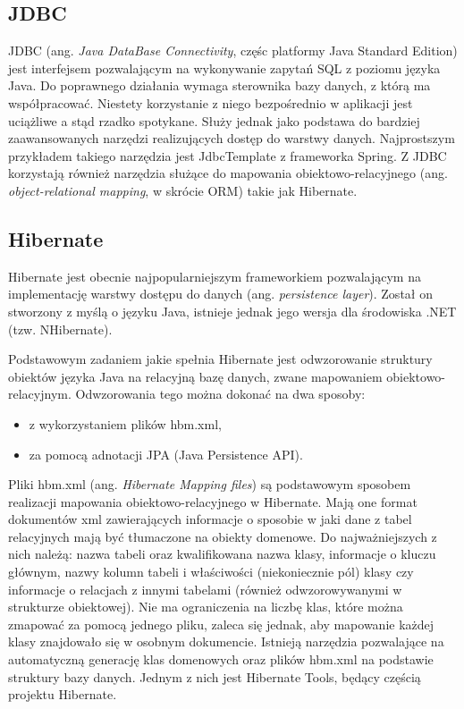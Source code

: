 
\subsection[JDBC][JDBC]{JDBC}
JDBC (ang. \textit{Java DataBase Connectivity}, częśc platformy Java Standard Edition) jest interfejsem pozwalającym na wykonywanie zapytań SQL z poziomu języka Java. Do poprawnego działania wymaga sterownika bazy danych, z którą ma współpracować. Niestety korzystanie z niego bezpośrednio w aplikacji jest uciążliwe a stąd rzadko spotykane. Służy jednak jako podstawa do bardziej zaawansowanych narzędzi realizujących dostęp do warstwy danych. Najprostszym przykładem takiego narzędzia jest JdbcTemplate z frameworka Spring. Z JDBC korzystają również narzędzia służące do mapowania obiektowo-relacyjnego (ang. \textit{object-relational mapping}, w skrócie ORM) takie jak Hibernate.

\subsection[Hibernate][Hibernate]{Hibernate}
\label{hibernate}
Hibernate jest obecnie najpopularniejszym frameworkiem pozwalającym na implementację warstwy dostępu do danych (ang. \textit{persistence layer}). Został on stworzony z myślą o języku Java, istnieje jednak jego wersja dla środowiska .NET (tzw. NHibernate).

Podstawowym zadaniem jakie spełnia Hibernate jest odwzorowanie struktury obiektów języka Java na relacyjną bazę danych, zwane mapowaniem obiektowo-relacyjnym. Odwzorowania tego można dokonać na dwa sposoby:
\begin{itemize}
	\item z wykorzystaniem plików hbm.xml,
	\item za pomocą adnotacji JPA (Java Persistence API).
\end{itemize}

Pliki hbm.xml (ang. \textit{Hibernate Mapping files}) są podstawowym sposobem realizacji mapowania obiektowo-relacyjnego w Hibernate. Mają one format dokumentów xml zawierających informacje o sposobie w jaki dane z tabel relacyjnych mają być tłumaczone na obiekty domenowe. Do najważniejszych z nich należą: nazwa tabeli oraz kwalifikowana nazwa klasy, informacje o kluczu głównym, nazwy kolumn tabeli i właściwości (niekoniecznie pól) klasy czy  informacje o relacjach z innymi tabelami (również odwzorowywanymi w strukturze obiektowej). Nie ma ograniczenia na liczbę klas, które można zmapować za pomocą jednego pliku, zaleca się jednak, aby mapowanie każdej klasy znajdowało się w osobnym dokumencie. Istnieją narzędzia pozwalające na automatyczną generację klas domenowych oraz plików hbm.xml na podstawie struktury bazy danych. Jednym z nich jest Hibernate Tools, będący częścią projektu Hibernate.


